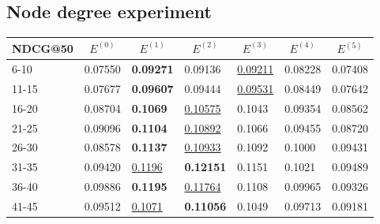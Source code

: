 \subsection{Node degree experiment}

\begin{table*}[]
    \begin{tabular}{|l|l|l|l|l|l|l|}
        \hline
        NDCG@50 & \multicolumn{1}{c|}{$E^{(0)}$} & \multicolumn{1}{c|}{$E^{(1)}$} & \multicolumn{1}{c|}{$E^{(2)}$} & \multicolumn{1}{c|}{$E^{(3)}$} & \multicolumn{1}{c|}{$E^{(4)}$} & \multicolumn{1}{c|}{$E^{(5)}$} \\ \hline
        6-10    & 0.07550                        & \textbf{0.09271}               & 0.09136                        & \underline{0.09211}            & 0.08228                        & 0.07408                        \\ \hline
        11-15   & 0.07677                        & \textbf{0.09607}               & 0.09444                        & \underline{0.09531}            & 0.08449                        & 0.07642                        \\ \hline
        16-20   & 0.08704                        & \textbf{0.1069}                & \underline{0.10575}            & 0.1043                         & 0.09354                        & 0.08562                        \\ \hline
        21-25   & 0.09096                        & \textbf{0.1104}                & \underline{0.10892}            & 0.1066                         & 0.09455                        & 0.08720                        \\ \hline
        26-30   & 0.08578                        & \textbf{0.1137}                & \underline{0.10933}            & 0.1092                         & 0.1000                         & 0.09431                        \\ \hline
        31-35   & 0.09420                        & \underline{0.1196}             & \textbf{0.12151}               & 0.1151                         & 0.1021                         & 0.09489                        \\ \hline
        36-40   & 0.09886                        & \textbf{0.1195}                & \underline{0.11764}            & 0.1108                         & 0.09965                        & 0.09326                        \\ \hline
        41-45   & 0.09512                        & \underline{0.1071}             & \textbf{0.11056}               & 0.1049                         & 0.09713                        & 0.09181                        \\ \hline

\end{tabular}
\end{table*}
